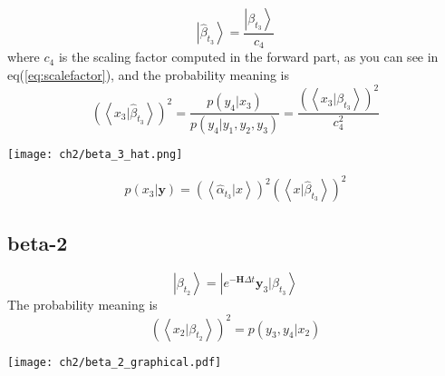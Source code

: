 \begin{definition}
\begin{equation}
        \left| \hat{\beta}_{t_{3}} \right> = \frac{ \left| \beta_{t_{3}} \right> }{ c_4 }
\end{equation}
where $c_4$ is the scaling factor computed in the forward part, as you can see in eq(\ref{eq:scalefactor}), and 
the probability meaning is
\begin{equation}
        \left(\left<x_3|\hat{\beta}_{t_{3}} \right>\right)^2 = \frac{p(y_4|x_3)}{p(y_4|y_1,y_2,y_3)} 
        =  \frac{ (\left<x_3|\beta_{t_{3}} \right>)^2 }{ c_4^2 }
\end{equation}
\begin{center}
        \texttt{[image: ch2/beta\_3\_hat.png]}
\end{center}
\begin{equation}
        p(x_3|\textbf{y}) = (\left<\hat{\alpha}_{t_{3}}|x \right>)^2 \left(\left<x|\hat{\beta}_{t_{3}} \right>\right)^2
\end{equation} 
\end{definition}

\subsection{beta-2}
\begin{definition}
\begin{equation}
        \left|\beta_{t_2}  \right> =  \left| e^{-\textbf{H}\Delta t} \textbf{y}_3 |\beta_{t_3} \right>
\end{equation}
The probability meaning is
\begin{equation}
           \left( \left<x_2 |\beta_{t_2}  \right> \right)^2 = p(y_3, y_4 | x_2)
\end{equation}
\begin{center}
        \texttt{[image: ch2/beta\_2\_graphical.pdf]}
\end{center}       
\end{definition}

